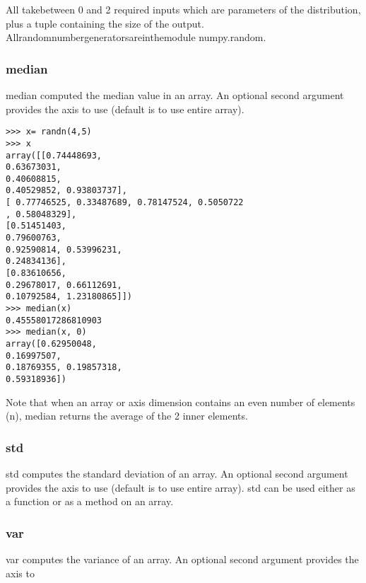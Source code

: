 \documentclass[KSmain.tex]{subfiles}
\begin{document}
All takebetween 0 and 2 required inputs which are parameters of the distribution, plus a tuple containing the size of the output. Allrandomnumbergeneratorsareinthemodule 
numpy.random.







\subsubsection{median}
median computed the median value in an array. An optional second argument provides the axis to use
(default is to use entire array).
\begin{verbatim}
>>> x= randn(4,5)
>>> x
array([[0.74448693,
0.63673031,
0.40608815,
0.40529852, 0.93803737],
[ 0.77746525, 0.33487689, 0.78147524, 0.5050722
, 0.58048329],
[0.51451403,
0.79600763,
0.92590814, 0.53996231,
0.24834136],
[0.83610656,
0.29678017, 0.66112691,
0.10792584, 1.23180865]])
>>> median(x)
0.45558017286810903
>>> median(x, 0)
array([0.62950048,
0.16997507,
0.18769355, 0.19857318,
0.59318936])
\end{verbatim}
Note that when an array or axis dimension contains an even number of elements (n), median returns the
average of the 2 inner elements.
\subsubsection{std}
std computes the standard deviation of an array. An optional second argument provides the axis to use
(default is to use entire array). std can be used either as a function or as a method on an array.
\subsubsection{var}
var computes the variance of an array. An optional second argument provides the axis to
\end{document}
